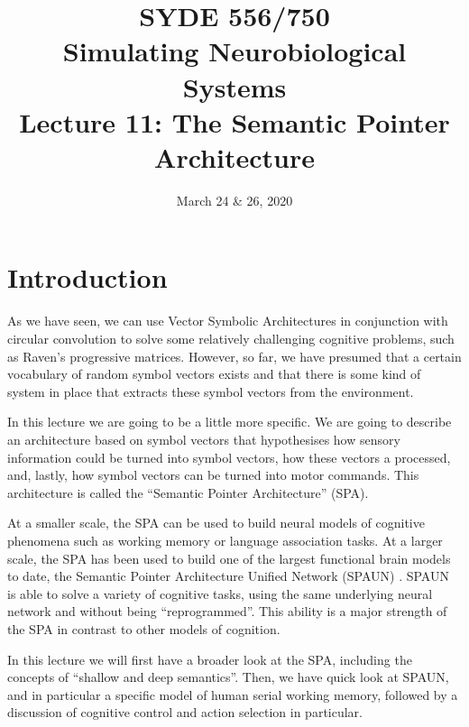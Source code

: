 \documentclass[10pt,letterpaper,oneside]{article}
\date{March 24 \& 26, 2020}
\title{SYDE 556/750 \\ Simulating Neurobiological Systems \\ Lecture 11: The Semantic Pointer Architecture}
\begin{document}

\section{Introduction}


As we have seen, we can use Vector Symbolic Architectures in conjunction with circular convolution to solve some relatively challenging cognitive problems, such as Raven's progressive matrices. However, so far, we have presumed that a certain vocabulary of random symbol vectors exists and that there is some kind of system in place that extracts these symbol vectors from the environment.

In this lecture we are going to be a little more specific. We are going to describe an architecture based on symbol vectors that hypothesises how sensory information could be turned into symbol vectors, how these vectors a processed, and, lastly, how symbol vectors can be turned into motor commands. This architecture is called the \enquote{Semantic Pointer Architecture} (SPA).

At a smaller scale, the SPA can be used to build neural models of cognitive phenomena such as working memory or language association tasks. At a larger scale, the SPA has been used to build one of the largest functional brain models to date, the Semantic Pointer Architecture Unified Network (SPAUN) \cite{eliasmith2012largescale,choo2018spaun}. SPAUN is able to solve a variety of cognitive tasks, using the same underlying neural network and without being \enquote{reprogrammed}. This ability is a major strength of the SPA in contrast to other models of cognition.

In this lecture we will first have a broader look at the SPA, including the concepts of \enquote{shallow and deep semantics}. Then, we have quick look at SPAUN, and in particular a specific model of human serial working memory, followed by a discussion of cognitive control and action selection in particular.
\end{document}
